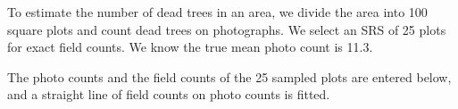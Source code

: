 \documentclass[
  letterpaper,
  DIV=11,
  numbers=noendperiod]{scrreprt}
\newenvironment{Shaded}{\begin{snugshade}}{\end{snugshade}}
\newcommand{\DecValTok}[1]{\textcolor[rgb]{0.68,0.00,0.00}{#1}}
\newcommand{\FunctionTok}[1]{\textcolor[rgb]{0.28,0.35,0.67}{#1}}
\newcommand{\NormalTok}[1]{\textcolor[rgb]{0.00,0.23,0.31}{#1}}
\newcommand{\OtherTok}[1]{\textcolor[rgb]{0.00,0.23,0.31}{#1}}
\newcommand{\SpecialCharTok}[1]{\textcolor[rgb]{0.37,0.37,0.37}{#1}}
\renewcommand{\[}{\begin{equation}}
\renewcommand{\]}{\end{equation}}
\begin{document}
To estimate the number of dead trees in an area, we divide the area into
100 square plots and count dead trees on photographs. We select an SRS
of 25 plots for exact field counts. We know the true mean photo count is
11.3.

The photo counts and the field counts of the 25 sampled plots are
entered below, and a straight line of field counts on photo counts is
fitted.

\begin{Shaded}
\end{Shaded}
\end{document}
